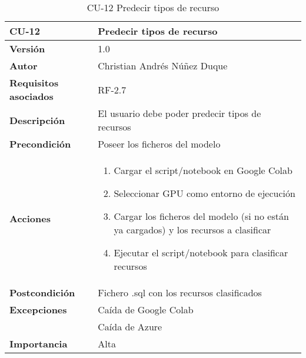 \begin{table}[p]
	\centering
	\begin{tabularx}{\linewidth}{ p{} p{} }
		\toprule
		\textbf{CU-12}    & \textbf{Predecir tipos de recurso}\\
		\toprule
		\textbf{Versión}              & 1.0    \\
		\textbf{Autor}                & Christian Andrés Núñez Duque \\
		\textbf{Requisitos asociados} & RF-2.7 \\
		\textbf{Descripción}          & El usuario debe poder predecir tipos de recursos \\
		\textbf{Precondición}         & Poseer los ficheros del modelo \\
		\textbf{Acciones}             &
		\begin{enumerate}
			\def\labelenumi{\arabic{enumi}.}
			\tightlist
			\item Cargar el script/notebook en Google Colab
			\item Seleccionar GPU como entorno de ejecución
			\item Cargar los ficheros del modelo (si no están ya cargados) y los recursos a clasificar
			\item Ejecutar el script/notebook para clasificar recursos
		\end{enumerate}\\
		\textbf{Postcondición}        & Fichero .sql con los recursos clasificados \\
		\textbf{Excepciones}          & Caída de Google Colab \\ & Caída de Azure \\
		\textbf{Importancia}          & Alta \\
		\bottomrule
	\end{tabularx}
	\caption{CU-12 Predecir tipos de recurso}
\end{table}

